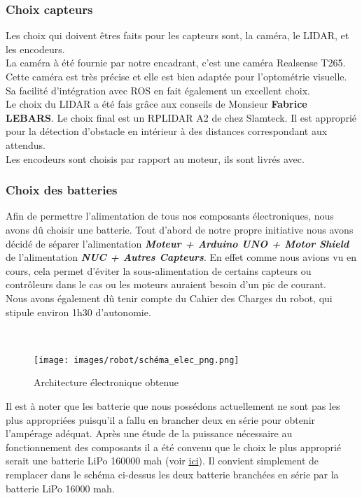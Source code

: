\documentclass[french]{rapportENSTAB}
\begin{document}
\subsubsection{Choix capteurs}

Les choix qui doivent êtres faits pour les capteurs sont, la caméra, le LIDAR, et les encodeurs. \\
La caméra à été fournie par notre encadrant, c'est une caméra Realsense T265. Cette caméra est très précise et elle est bien adaptée pour l'optométrie visuelle. Sa facilité d'intégration avec ROS en fait également un excellent choix.\\
Le choix du LIDAR a été fais grâce aux conseils de Monsieur \textbf{Fabrice LEBARS}. Le choix final est un RPLIDAR A2 de chez Slamteck. Il est approprié pour la détection d'obstacle en intérieur à des distances correspondant aux attendus.\\
Les encodeurs sont choisis par rapport au moteur, ils sont livrés avec.




\subsubsection{Choix des batteries}
Afin de permettre l'alimentation de tous nos composants électroniques, nous avons dû choisir une batterie. Tout d'abord de notre propre initiative nous avons décidé de séparer l'alimentation \textit{\textbf{Moteur + Arduino UNO + Motor Shield}} de l'alimentation \textit{\textbf{NUC + Autres Capteurs}}. En effet comme nous avions vu en cours, cela permet d'éviter la sous-alimentation de certains capteurs ou contrôleurs dans le cas ou les moteurs auraient besoin d'un pic de courant.\\
Nous avons également dû tenir compte du Cahier des Charges du robot, qui stipule environ 1h30 d'autonomie.

\\

 \begin{figure}[H]
    \centering
    \texttt{[image: images/robot/schéma\_elec\_png.png]}
    \caption{Architecture électronique obtenue}
    \label{fig:cdcf}
\end{figure}


Il est à noter que les batterie que nous possédons actuellement ne sont pas les plus appropriées puisqu'il a fallu en brancher deux en série pour obtenir l'ampérage adéquat. Après une étude de la puissance nécessaire au fonctionnement des composants il a été convenu que le choix le plus approprié serait une batterie LiPo 160000 mah (voir  \href{https://www.iplanes-rc.fr/produit/batterie-lipo-22-2-volt-16000mah-25c/}{ici}).
Il convient simplement de remplacer dans le schéma ci-dessus les deux batterie branchées en série par la batterie LiPo 16000 mah.
\end{document}
